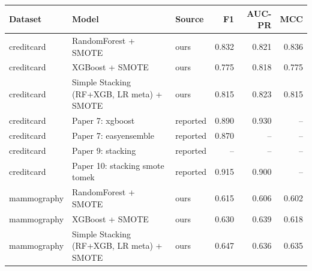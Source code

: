 \begin{tabular}{lllrrr}
\toprule
Dataset & Model & Source & F1 & AUC-PR & MCC \\
\midrule
creditcard & RandomForest + SMOTE & ours & 0.832 & 0.821 & 0.836 \\
creditcard & XGBoost + SMOTE & ours & 0.775 & 0.818 & 0.775 \\
creditcard & Simple Stacking (RF+XGB, LR meta) + SMOTE & ours & 0.815 & 0.823 & 0.815 \\
creditcard & Paper 7: xgboost & reported & 0.890 & 0.930 & -- \\
creditcard & Paper 7: easyensemble & reported & 0.870 & -- & -- \\
creditcard & Paper 9: stacking & reported & -- & -- & -- \\
creditcard & Paper 10: stacking smote tomek & reported & 0.915 & 0.900 & -- \\
mammography & RandomForest + SMOTE & ours & 0.615 & 0.606 & 0.602 \\
mammography & XGBoost + SMOTE & ours & 0.630 & 0.639 & 0.618 \\
mammography & Simple Stacking (RF+XGB, LR meta) + SMOTE & ours & 0.647 & 0.636 & 0.635 \\
\bottomrule
\end{tabular}
